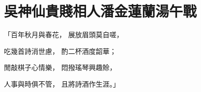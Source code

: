 %

\chapter{吳神仙貴賤相人\KG 潘金蓮蘭湯午戰}


\begin{showcontents}{}



「百年秋月與春花，  展放眉頭莫自嗟，

吃幾首詩消世慮，  酌二杯酒度韶華；

閒敲棋子心情樂，  悶撥瑤琴興趣賒，

人事與時俱不管，  且將詩酒作生涯。」


\end{showcontents}
